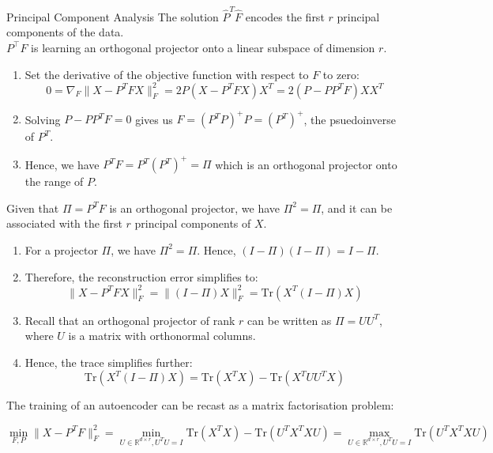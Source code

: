 \begin{theorembox}{Principal Component Analysis}
    The solution $\hat{P} ^T \hat{F}$ encodes the first $r$ principal components of the data.\\

    $P ^\top F$ is learning an orthogonal projector onto a linear subspace of dimension $r$. 
    \begin{enumerate}
    \item Set the derivative of the objective function with respect to \( F \) to zero:
    \[ 0 = \nabla_F \|X - P^T FX\|_F^2 = 2P(X - P^T FX)X^T = 2(P - PP^T F)XX^T \]
    
    \item Solving \( P - PP^T F = 0 \) gives us \( F = (P^T P)^{+}P = (P^T)^+\), the psuedoinverse of $P^T$.
    
    \item Hence, we have \( P^T F = P^T (P^T )^{+} = \Pi \) which is an orthogonal projector onto the range of \( P \).
\end{enumerate}

Given that \( \Pi = P^T F \) is an orthogonal projector, we have \( \Pi^2 = \Pi \), and it can be associated with the first \( r \) principal components of \( X \).

\begin{enumerate}
    \item For a projector \( \Pi \), we have \( \Pi^2 = \Pi \). Hence, \( (I - \Pi)(I - \Pi) = I - \Pi \).
    
    \item Therefore, the reconstruction error simplifies to:
    \[ \|X - P^T FX\|_F^2 = \|(I - \Pi)X\|_F^2 = \text{Tr}(X^T (I - \Pi)X) \]
    
    \item Recall that an orthogonal projector of rank \( r \) can be written as \( \Pi = UU^T \), where \( U \) is a matrix with orthonormal columns.
    
    \item Hence, the trace simplifies further:
    \[ \text{Tr}(X^T (I - \Pi)X) = \text{Tr}(X^T X) - \text{Tr}(X^T UU^T X) \]
\end{enumerate}

The training of an autoencoder can be recast as a matrix factorisation problem:

\begin{equation}
\min_{F,P} \|X - P^T F\|_F^2 = \min_{U \in \mathbb{R}^{d \times r}, U^T U = I} \text{Tr}(X^T X) - \text{Tr}(U^T X^T X U) = \max_{U \in \mathbb{R}^{d \times r}, U^T U = I} \text{Tr}(U^T X^T X U)
\end{equation}


\end{theorembox}
